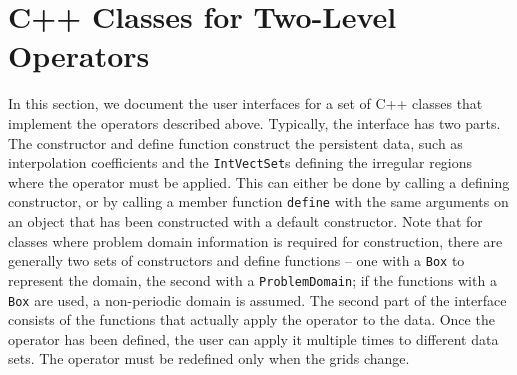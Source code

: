 \section{C++ Classes for Two-Level Operators}

In this section, we document the user interfaces for a set of C++
classes that implement the operators described above. Typically, the
interface has two parts. The constructor and define function construct
the persistent data, such as interpolation coefficients and the 
{\tt IntVectSet}s defining the irregular regions where 
the operator must be applied. This can either be done by calling a
defining constructor, or by calling a member function {\tt define} with
the same arguments on an object that has been constructed with a default
constructor. Note that for classes where problem domain information is
required for construction, there are generally two sets of
constructors and define functions -- one with a {\tt Box} to represent
the domain, the second with a {\tt ProblemDomain}; if the functions
with a {\tt Box} are used, a non-periodic domain is assumed.
The second part of the interface consists of the functions
that actually apply the operator to the data. Once the operator has been
defined, the user can apply it multiple times to different data sets. 
The operator must be redefined only when the grids change. 



